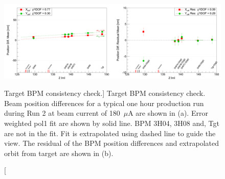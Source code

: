 \begin{singlespace}
\begin{figure}[!h]
	\begin{center}
	\includegraphics[width=15.0cm]{figures/targetBPMConsistencyCheck}
	\end{center}
	\caption
	[Target BPM consistency check.]
	{Target BPM consistency check. Beam position differences for a typical one hour production run during Run 2 at beam current of 180~$\mu$A are shown in (a). Error weighted pol1 fit are shown by solid line. BPM 3H04, 3H08 and, Tgt are not in the fit. Fit is extrapolated using dashed line to guide the view. The residual of the BPM position differences and extrapolated orbit from target are shown in (b).}
	\label{fig:targetBPMConsistencyCheck}
\end{figure}
\end{singlespace}

